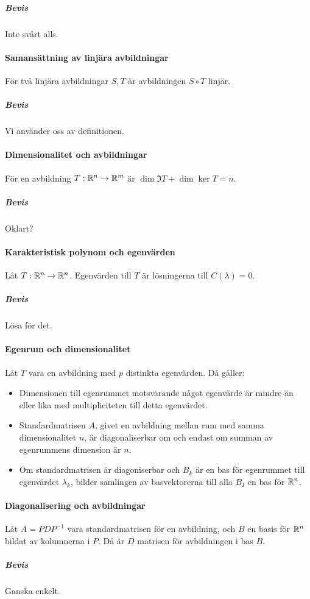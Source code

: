 \subparagraph{Bevis}
Inte svårt alls.

\paragraph{Samansättning av linjära avbildningar}
För två linjära avbildningar $S, T$ är avbildningen $S\circ T$ linjär.

\subparagraph{Bevis}
Vi använder oss av definitionen.

\paragraph{Dimensionalitet och avbildningar}
För en avbildning $T: \mathbb{R}^n\to\mathbb{R}^m$ är $\dim{\Im T} + \dim{\ker{T}} = n$.

\subparagraph{Bevis}
Oklart?

\paragraph{Karakteristisk polynom och egenvärden}
Låt $T:\mathbb{R}^n\to\mathbb{R}^n$. Egenvärden till $T$ är lösningerna till $C(\lambda) = 0$.

\subparagraph{Bevis}
Lösa för det.

\paragraph{Egenrum och dimensionalitet}
Låt $T$ vara en avbildning med $p$ distinkta egenvärden. Då gäller:
\begin{itemize}
	\item Dimensionen till egenrummet motsvarande något egenvärde är mindre än eller lika med multipliciteten till detta egenvärdet.
	\item Standardmatrisen $A$, givet en avbildning mellan rum med samma dimensionalitet $n$, är diagonaliserbar om och endast om summan av egenrummens dimension är $n$.
	\item Om standardmatrisen är diagoniserbar och $B_k$ är en bas för egenrummet till egenvärdet $\lambda_k$, bilder samlingen av basvektorerna till alla $B_I$ en bas för $\mathbb{R}^n$.
\end{itemize}

\paragraph{Diagonalisering och avbildningar}
Låt $A = PDP^{-1}$ vara standardmatrisen för en avbildning, och $B$ en basis för $\mathbb{R}^n$ bildat av kolumnerna i $P$. Då är $D$ matrisen för avbildningen i bas $B$.

\subparagraph{Bevis}
Ganska enkelt.